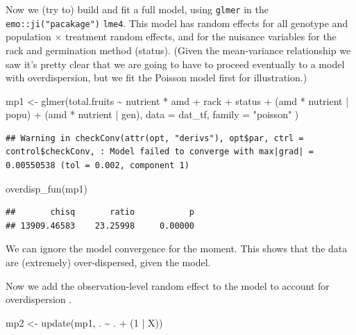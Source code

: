 \documentclass[
  12pt,
]{book}
\newenvironment{Shaded}{\begin{snugshade}}{\end{snugshade}}
\newcommand{\AttributeTok}[1]{\textcolor[rgb]{0.77,0.63,0.00}{#1}}
\newcommand{\DecValTok}[1]{\textcolor[rgb]{0.00,0.00,0.81}{#1}}
\newcommand{\FunctionTok}[1]{\textcolor[rgb]{0.00,0.00,0.00}{#1}}
\newcommand{\NormalTok}[1]{#1}
\newcommand{\OtherTok}[1]{\textcolor[rgb]{0.56,0.35,0.01}{#1}}
\newcommand{\SpecialCharTok}[1]{\textcolor[rgb]{0.00,0.00,0.00}{#1}}
\newcommand{\StringTok}[1]{\textcolor[rgb]{0.31,0.60,0.02}{#1}}
\begin{document}
Now we (try to) build and fit a full model, using \texttt{glmer} in the \texttt{emo::ji("pacakage")} \texttt{lme4}. This model has random effects for all genotype and population × treatment random effects, and for the nuisance variables for the rack and germination method (status). (Given the mean-variance relationship we saw it's pretty clear that we are going to have to proceed eventually to a model with overdispersion, but we fit the Poisson model first for illustration.)

\begin{Shaded}
\begin{Highlighting}[]
\NormalTok{mp1 }\OtherTok{\textless{}{-}} \FunctionTok{glmer}\NormalTok{(total.fruits }\SpecialCharTok{\textasciitilde{}}\NormalTok{ nutrient }\SpecialCharTok{*}\NormalTok{ amd }\SpecialCharTok{+}
\NormalTok{  rack }\SpecialCharTok{+}\NormalTok{ status }\SpecialCharTok{+}
\NormalTok{  (amd }\SpecialCharTok{*}\NormalTok{ nutrient }\SpecialCharTok{|}\NormalTok{ popu) }\SpecialCharTok{+}
\NormalTok{  (amd }\SpecialCharTok{*}\NormalTok{ nutrient }\SpecialCharTok{|}\NormalTok{ gen),}
\AttributeTok{data =}\NormalTok{ dat\_tf, }\AttributeTok{family =} \StringTok{"poisson"}
\NormalTok{)}
\end{Highlighting}
\end{Shaded}

\begin{verbatim}
## Warning in checkConv(attr(opt, "derivs"), opt$par, ctrl = control$checkConv, : Model failed to converge with max|grad| = 0.00550538 (tol = 0.002, component 1)
\end{verbatim}

\begin{Shaded}
\begin{Highlighting}[]
\FunctionTok{overdisp\_fun}\NormalTok{(mp1)}
\end{Highlighting}
\end{Shaded}

\begin{verbatim}
##       chisq       ratio           p 
## 13909.46583    23.25998     0.00000
\end{verbatim}

We can ignore the model convergence for the moment. This shows that the data are (extremely) over-dispersed, given the model.

Now we add the observation-level random effect to the model to account for overdispersion \citep{elston2001}.

\begin{Shaded}
\begin{Highlighting}[]
\NormalTok{mp2 }\OtherTok{\textless{}{-}} \FunctionTok{update}\NormalTok{(mp1, . }\SpecialCharTok{\textasciitilde{}}\NormalTok{ . }\SpecialCharTok{+}\NormalTok{ (}\DecValTok{1} \SpecialCharTok{|}\NormalTok{ X))}
\end{Highlighting}
\end{Shaded}
\end{document}
